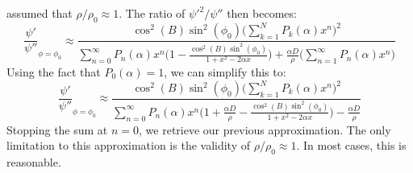 \documentclass[crop=false,class=book,oneside]{standalone}
\begin{document}
            assumed that $\rho/\rho_{0}\approx{1}$. The ratio of
            $\psi'^{2}/\psi''$ then becomes:
            \begin{equation*}
                \frac{\psi'}{\psi''}_{\phi=\phi_{0}}\approx
                \frac{\cos^{2}(B)\sin^{2}(\phi_{0})
                      \Big(\sum_{k=1}^{N}P_{k}(\alpha)x^{n}\Big)^{2}}
                     {\sum_{n=0}^{\infty}P_{n}(\alpha)x^{n}
                      \Big(1-\frac{\cos^{2}(B)\sin^{2}(\phi_{0})}
                                  {1+x^{2}-2\alpha{x}}\Big)+
                      \frac{\alpha{D}}{\rho}
                      \Big(\sum_{n=1}^{\infty}P_{n}(\alpha)x^{n}\Big)}
            \end{equation*}
            Using the fact that $P_{0}(\alpha)=1$, we can simplify
            this to:
            \begin{equation*}
                \frac{\psi'}{\psi''}_{\phi=\phi_{0}}\approx
                \frac{\cos^{2}(B)\sin^{2}(\phi_{0})
                      \Big(\sum_{k=1}^{N}P_{k}(\alpha)x^{n}\Big)^{2}}
                     {\sum_{n=0}^{\infty}P_{n}(\alpha)x^{n}
                      \Big(1+\frac{\alpha{D}}{\rho}-
                           \frac{\cos^{2}(B)\sin^{2}(\phi_{0})}
                                {1+x^{2}-2\alpha{x}}\Big)-
                      \frac{\alpha{D}}{\rho}}
            \end{equation*}
            Stopping the sum at $n=0$, we retrieve our previous
            approximation. The only limitation to this approximation
            is the validity of $\rho/\rho_{0}\approx{1}$. In
            most cases, this is reasonable.
\end{document}

